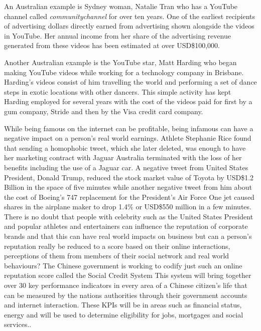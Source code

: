 An Australian example is Sydney woman, Natalie Tran who has a YouTube channel called \textit{communitychannel} for over ten years. One of the earliest recipients of advertising dollars directly earned from advertising shown alongside the videos in YouTube.  Her annual income from her share of the advertising revenue generated from these videos has been estimated at over USD\$100,000.

Another Australian example is the YouTube star, Matt Harding who began making YouTube videos while working for a technology company in Brisbane. Harding's videos consist of him travelling the world and performing a set of dance steps in exotic locations with other dancers. This simple activity has kept Harding employed for several years with the cost of the videos paid for first by a gum company, Stride\cite{RefWorks:383} and then by the Visa credit card company\cite{RefWorks:384}. 

While being famous on the internet can be profitable, being infamous can have a negative impact on a person's real world earnings. Athlete Stephanie Rice found that sending a homophobic tweet, which she later deleted, was enough to have her marketing contract with Jaguar Australia terminated with the loss of her benefits including the use of a Jaguar car\cite{RefWorks:386}. A negative tweet from United States President, Donald Trump, reduced the stock market value of Toyota by USD\$1.2 Billion in the space of five minutes while another negative tweet from him about the cost of Boeing's 747 replacement for the President's Air Force One jet caused shares in the airplane maker to drop 1.4\% or USD\$550 million in a few minutes.  There is no doubt that people with celebrity such as the United States President and popular athletes and entertainers can influence the reputation of corporate brands and that this can have real world impacts on business but can a person's reputation really be reduced to a score based on their online interactions, perceptions of them from members of their social network and real world behaviours? The Chinese government is working to codify just such an online reputation score called the Social Credit System\cite{RefWorks:390} This system will bring together over 30 key performance indicators in every area  of a Chinese citizen's life that can be measured by the nations authorities through their government accounts and internet interaction. These KPIs will be in areas such as financial status, energy and will be used to determine eligibility for jobs, mortgages and social services.\cite{RefWorks:389}.

